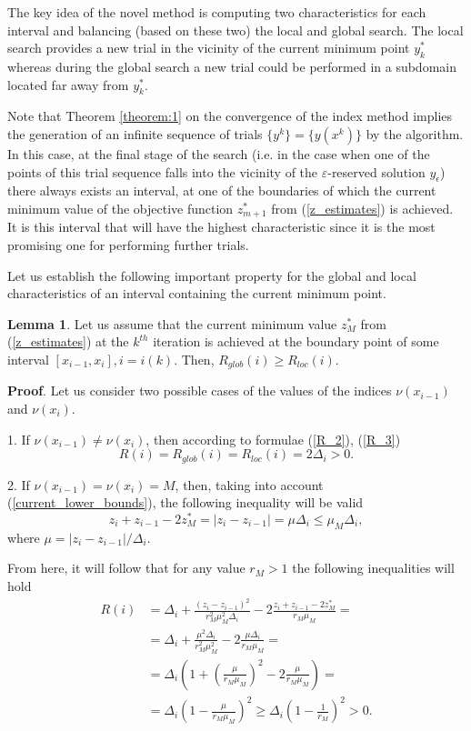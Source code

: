 \documentclass[twocolumn]{svjour3}          %
\begin{document}
	The key idea of the novel method is computing two characteristics for each interval and balancing (based on these two) the local and global search. The local search provides a new trial in the vicinity of the current minimum point $y_k^\ast$  whereas during the global search a new trial could be performed in a subdomain located far away from $y_k^\ast$. 
	
	Note that Theorem \ref{theorem:1} on the convergence of the index method implies the generation of an infinite sequence of trials $\{y^k\}=\big\{y(x^k )\big\}$ by the algorithm. In this case, at the final stage of the search (i.e. in the case when one of the points of this trial sequence falls into the vicinity of the $\varepsilon$-reserved solution $y_\epsilon$) there always exists an interval, at one of the boundaries of which the current minimum value of the objective function $z_{m+1}^\ast$  from (\ref{z_estimates}) is achieved. It is this interval that will have the highest characteristic since it is the most promising one for performing further trials. 

	Let us establish the following important property for the global and local characteristics of an interval containing the current minimum point.

	\textbf{Lemma 1}. Let us assume that the current minimum value $z_M^\ast$  from (\ref{z_estimates}) at the $k^{th}$ iteration is achieved at the boundary point of some interval $[x_{i-1}, x_i], i=i(k)$. Then, $R_{glob}(i) \geq R_{loc}(i)$.

	\textbf{Proof}. Let us consider two possible cases of the values of the indices $\nu(x_{i-1})$ and $\nu(x_i)$. 
	
  1. If $\nu(x_{i-1}) \neq \nu(x_i)$, then according to  formulae (\ref{R_2}), (\ref{R_3}) 
\begin{equation}\label{R_glob_1}
	R(i)=R_{glob}(i)=R_{loc}(i)=2\Delta_i>0. 
\end{equation}


	2. If $\nu(x_{i-1}) = \nu(x_i) = M$, then, taking into account (\ref{current_lower_bounds}), the following inequality will be valid
$$
	z_i+z_{i-1}-2z_M^* = |z_i-z_{i-1}| = \mu \Delta_i \leq \mu_M\Delta_i,
$$
where $\mu = |z_i-z_{i-1}|/\Delta_i$.

From here, it will follow that for any value $r_M>1$ the following inequalities will hold
\begin{align}
	R(i) & = \Delta_i + \frac{(z_i-z_{i-1})^2}{r_M^2\mu_M^2\Delta_i} - 2\frac{z_i+z_{i-1}-2z_M^*}{r_M\mu_M} = \nonumber \\
	& = \Delta_i + \frac{\mu^2\Delta_i}{r_M^2\mu_M^2} - 2\frac{\mu\Delta_i}{r_M\mu_M} = \nonumber \\
  & = \Delta_i\left(1 + \left(\frac{\mu}{r_M\mu_M}\right)^2 - 2\frac{\mu}{r_M\mu_M}\right) = \nonumber \\
	& = \Delta_i\left(1 - \frac{\mu}{r_M\mu_M}\right)^2 \geq  \Delta_i \left( 1-\frac{1}{r_M}\right)^2 > 0.
\end{align}
\end{document}
